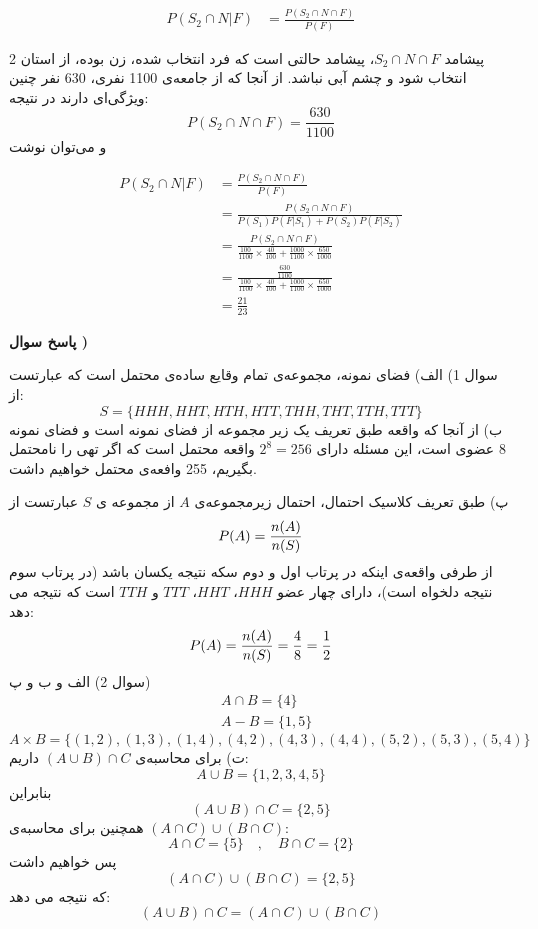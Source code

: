 \documentclass[10pt,letterpaper]{report}
\newcounter{questionanswernumber}
\newcommand{\QA}{
\textbf{پاسخ سوال \thequestionanswernumber)}
\stepcounter{questionanswernumber}
}
\newcommand{\eqn}[1]{
\[\begin{split}
#1
\end{split}\]
}
\begin{document}
{\eqn{
P(S_2\cap N|F)&=
\frac{P(S_2\cap N\cap F)}{P(F)}
}
پیشامد $S_2\cap N\cap F$، پیشامد حالتی است که فرد انتخاب شده، زن بوده، از استان 2 انتخاب شود و چشم آبی نباشد. از آنجا که از جامعه‌ی 1100 نفری، 630 نفر چنین ویژگی‌ای دارند در نتیجه:
$$P(S_2\cap N\cap F)=\frac{630}{1100}$$
و می‌توان نوشت
\eqn{
P(S_2\cap N|F)&=
\frac{P(S_2\cap N\cap F)}{P(F)}
\\&=
\frac{P(S_2\cap N\cap F)}{P(S_1)P(F|S_1)+P(S_2)P(F|S_2)}
\\&=
\frac{P(S_2\cap N\cap F)}{
\frac{100}{1100}\times \frac{40}{100}+\frac{1000}{1100}\times \frac{650}{1000}
}
\\&=
\frac{\frac{630}{1100}}{
\frac{100}{1100}\times \frac{40}{100}+\frac{1000}{1100}\times \frac{650}{1000}
}
\\&=
\frac{21}{23}
}









}







\QA


سوال 1) الف) فضای نمونه، مجموعه‌ی تمام وقایع ساده‌ی محتمل است که عبارتست از:
$$
S=\{HHH,HHT,HTH,HTT,THH,THT,TTH,TTT\}
$$
ب) از آنجا که واقعه طبق تعریف یک زیر مجموعه از فضای نمونه است و فضای نمونه 8 عضوی است، این مسئله دارای $2^8=256$ واقعه محتمل است که اگر تهی را نامحتمل بگیریم، 255 وافعه‌ی محتمل خواهیم داشت.

پ) طبق تعریف کلاسیک احتمال، احتمال زیرمجموعه‌ی $A$ از مجموعه ی $S$ عبارتست از
$$
P(A)={n(A)\over n(S)}
$$
از طرفی واقعه‌ی اینکه در پرتاب اول و دوم سکه نتیجه یکسان باشد (در پرتاب سوم نتیجه دلخواه است)، دارای چهار عضو $HHH$، $HHT$، $TTT$ و $TTH$ است که نتیجه می دهد:
$$
P(A)={n(A)\over n(S)}={4\over8}={1\over2}
$$
سوال 2) الف و ب و پ)
\[
\begin{split}
&A\cap B=\{4\}
\\&A-B=\{1,5\}
\end{split}
\]
$$
A\times B=\{(1,2),(1,3),(1,4),(4,2),(4,3),(4,4),(5,2),(5,3),(5,4)\}
$$
ت) برای محاسبه‌ی 
$
(A\cup B)\cap C
$
داریم:
$$
A\cup B=\{1,2,3,4,5\}
$$
بنابراین
$$
(A\cup B)\cap C=\{2,5\}
$$
همچنین برای محاسبه‌ی $(A\cap C)\cup (B\cap C)$:
$$
A\cap C=\{5\}\quad,\quad B\cap C=\{2\}
$$
پس خواهیم داشت
$$
(A\cap C)\cup(B\cap C)=\{2,5\}
$$
که نتیجه می دهد:
$$
(A\cup B)\cap C=(A\cap C)\cup (B\cap C)
$$
\end{document}
